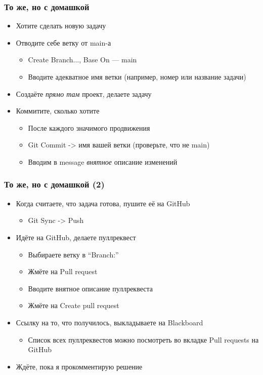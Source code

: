 \documentclass[xetex,mathserif,serif]{beamer}
\begin{document}
    \begin{frame}
        \frametitle{То же, но с домашкой}
        \begin{itemize}
            \item Хотите сделать новую задачу
            \item Отводите себе ветку от main-а
            \begin{itemize}
                \item Create Branch..., Base On --- main
                \item Вводите адекватное имя ветки (например, номер или название задачи)
            \end{itemize}
            \item Создаёте \emph{прямо там} проект, делаете задачу
            \item Коммитите, сколько хотите
            \begin{itemize}
                \item После каждого значимого продвижения
                \item Git Commit -> имя вашей ветки (проверьте, что не main)
                \item Вводим в message \emph{внятное} описание изменений
            \end{itemize}
        \end{itemize}
    \end{frame}

    \begin{frame}
        \frametitle{То же, но с домашкой (2)}
        \begin{itemize}
            \item Когда считаете, что задача готова, пушите её на GitHub
            \begin{itemize}
                \item Git Sync -> Push
            \end{itemize}
            \item Идёте на GitHub, делаете пуллреквест
            \begin{itemize}
                \item Выбираете ветку в ``Branch:''
                \item Жмёте на Pull request
                \item Вводите внятное описание пуллреквеста
                \item Жмёте на Create pull request
            \end{itemize}
            \item Ссылку на то, что получилось, выкладываете на Blackboard
            \begin{itemize}
                \item Список всех пуллреквестов можно посмотреть во вкладке Pull requests на GitHub
            \end{itemize}
            \item Ждёте, пока я прокомментирую решение
        \end{itemize}
    \end{frame}
\end{document}
